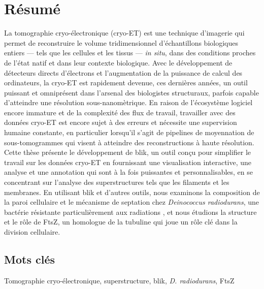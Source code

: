 \section*{Résumé} %
La tomographie cryo-électronique (cryo-ET) est une technique d'imagerie qui permet de reconstruire le volume tridimensionnel d'échantillons biologiques entiers --- tels que les cellules et les tissus --- \textit{in situ}, dans des conditions proches de l'état natif et dans leur contexte biologique.
Avec le développement de détecteurs directs d'électrons et l'augmentation de la puissance de calcul des ordinateurs, la cryo-ET est rapidement devenue, ces dernières années, un outil puissant et omniprésent dans l'arsenal des biologistes structuraux, parfois capable d'atteindre une résolution sous-nanomètrique.
En raison de l'écosystème logiciel encore immature et de la complexité des flux de travail, travailler avec des données cryo-ET est encore sujet à des erreurs et nécessite une supervision humaine constante, en particulier lorsqu'il s'agit de pipelines de moyennation de sous-tomogrammes qui visent à atteindre des reconstructions à haute résolution.
Cette thèse présente le développement de blik, un outil conçu pour simplifier le travail sur les données cryo-ET en fournissant une visualisation interactive, une analyse et une annotation qui sont à la fois puissantes et personnalisables, en se concentrant sur l'analyse des superstructures tels que les filaments et les membranes.
En utilisant blik et d'autres outils, nous examinons la composition de la paroi cellulaire et le mécanisme de septation chez \textit{Deinococcus radiodurans}, une bactérie résistante particulièrement aux radiations , et nous étudions la structure et le rôle de FtsZ, un homologue de la tubuline qui joue un rôle clé dans la division cellulaire.

\subsection*{Mots clés}
Tomographie cryo-électronique, superstructure, blik, \textit{D. radiodurans}, FtsZ
